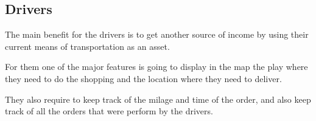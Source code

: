 \subsection{Drivers}
The main benefit for the drivers is to get another source of income by using 
their current means of transportation as an asset. \newline

\noindent For them one of the major features is going to display in the map 
the play where they need to do the shopping and the location where they need 
to deliver. \newline

\noindent They also require to keep track of the milage and time of the order, 
and also keep track of all the orders that were perform by the drivers.

